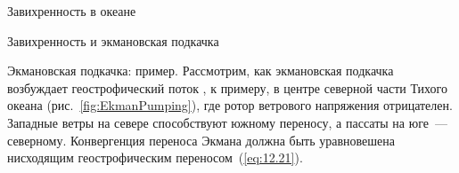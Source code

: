 \begin{chapter}{Завихренность в океане}
\begin{section}{Завихренность и экмановская подкачка}
\begin{paragraph}{Экмановская подкачка: пример.}
Рассмотрим, как экмановская подкачка 
возбуждает геострофический поток%
,
к примеру, в центре северной части Тихого океана (рис.~\ref{fig:EkmanPumping}),
где ротор ветрового напряжения отрицателен. 
Западные ветры на севере способствуют
южному переносу, 
а пассаты на юге~--- северному. 
Конвергенция переноса Экмана должна быть уравновешена
нисходящим геострофическим переносом~(\ref{eq:12.21}).
%


\end{paragraph}
\end{section}
\end{chapter}
